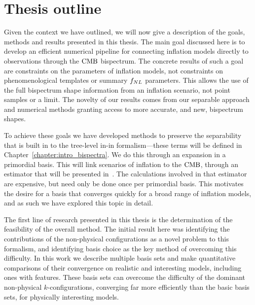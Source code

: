 

\section{Thesis outline}
Given the context we have outlined,
    we will now give a description of the goals, methods
    and results presented in this thesis.
    The main goal discussed here is to develop an efficient numerical pipeline for
    connecting inflation models directly to observations through the $\text{CMB}$ bispectrum.
    The concrete results of such a goal are constraints on the parameters of inflation models,
    not constraints on phenomenological templates or summary $f_{NL}$ parameters.
    This allows the use of the full bispectrum shape information from an inflation scenario,
    not point samples or a limit. The novelty of our results comes from our separable
    approach and numerical methods
    granting access to more accurate, and new, bispectrum shapes.


    To achieve these goals we have developed methods to preserve the
    separability that is built in to the tree-level in-in formalism---these
    terms will be defined in Chapter~\ref{chapter:intro_bispectra}.
    We do this through an expansion in a primordial basis.
    This will link scenarios of inflation to the $\text{CMB}$,
    through an estimator that will be presented in~\cite{Sohn_2021}.
    The calculations involved in that estimator are expensive,
    but need only be done once per primordial basis.
    This motivates the desire for a basis that converges quickly for a broad range of inflation models,
    and as such we have explored this topic in detail.


The first line of research presented in this thesis
is the determination of the feasibility of the overall method.
The initial result here was identifying the contributions of the non-physical configurations
as a novel problem to this formalism,
and identifying basis choice as the key method of overcoming this difficulty.
In this work we describe multiple basis sets and make quantitative comparisons
of their convergence on realistic and interesting models, including ones with features.
These basis sets can overcome the difficulty of the dominant non-physical $k$-configurations,
converging far more efficiently than the basic basis sets, for physically interesting models.


